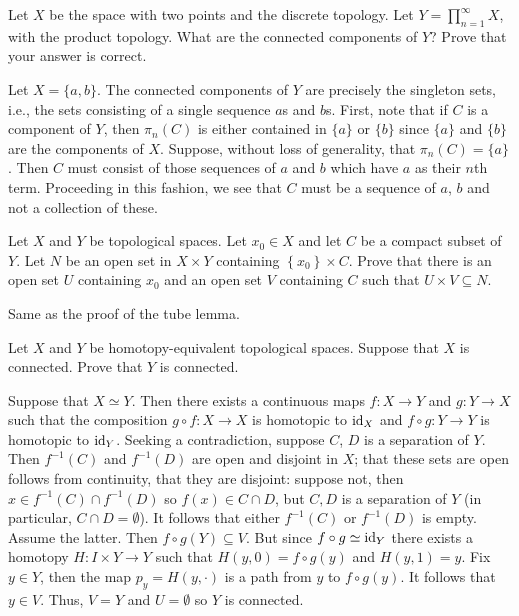 \begin{problem}
  Let \(X\) be the space with two points and the discrete topology. Let
  \(Y=\prod_{n=1}^\infty X\), with the product topology. What are the
  connected components of \(Y\)? Prove that your answer is correct.
\end{problem}
\begin{solution}
  Let \(X=\{a,b\}\). The connected components of \(Y\) are precisely the
  singleton sets, i.e., the sets consisting of a single sequence \(a\)s and
  \(b\)s. First, note that if \(C\) is a component of \(Y\), then
  \(\pi_n(C)\) is either contained in \(\{a\}\) or \(\{b\}\) since
  \(\{a\}\) and \(\{b\}\) are the components of \(X\). Suppose, without
  loss of generality, that \(\pi_n(C)=\{a\}\). Then \(C\) must consist of
  those sequences of \(a\) and \(b\) which have \(a\) as their \(n\)th
  term. Proceeding in this fashion, we see that \(C\) must be a sequence of
  \(a\), \(b\) and not a collection of these.
\end{solution}

\begin{problem}
  Let \(X\) and \(Y\) be topological spaces. Let \(x_0\in X\) and let \(C\)
  be a compact subset of \(Y\). Let \(N\) be an open set in \(X\times Y\)
  containing \(\left\{x_0\right\}\times C\). Prove that there is an open
  set \(U\) containing \(x_0\) and an open set \(V\) containing \(C\) such
  that \(U\times V\subseteq N\).
\end{problem}
\begin{solution}
  Same as the proof of the tube lemma.
\end{solution}

\begin{problem}
  Let \(X\) and \(Y\) be homotopy-equivalent topological spaces. Suppose
  that \(X\) is connected. Prove that \(Y\) is connected.
\end{problem}
\begin{solution}
  Suppose that \(X\simeq Y\). Then there exists a continuous maps
  \(f\colon X\to Y\) and \(g\colon Y\to X\) such that the composition
  \(g\circ f\colon X\to X\) is homotopic to \(\operatorname{id}_X\) and
  \(f\circ g\colon Y\to Y\) is homotopic to \(\operatorname{id}_Y\). Seeking a
  contradiction, suppose \(C\), \(D\) is a separation of \(Y\). Then
  \(f^{-1}(C)\) and \(f^{-1}(D)\) are open and disjoint in \(X\); that
  these sets are open follows from continuity, that they are disjoint:
  suppose not, then \(x\in f^{-1}(C)\cap f^{-1}(D)\) so \(f(x)\in C\cap
  D\), but \(C,D\) is a separation of \(Y\) (in particular, \(C\cap
  D=\emptyset\)). It follows that either \(f^{-1}(C)\) or \(f^{-1}(D)\) is
  empty. Assume the latter. Then \(f\circ g(Y)\subseteq V\). But since
  \(f\circ g\simeq \operatorname{id}_Y\) there exists a homotopy \(H\colon I\times Y\to
  Y\) such that \(H(y,0)=f\circ g(y)\) and \(H(y,1)=y\). Fix \(y\in Y\),
  then the map \(p_y=H(y,\cdot)\) is a path from \(y\) to \(f\circ
  g(y)\). It follows that \(y\in V\). Thus, \(V=Y\) and \(U=\emptyset\) so
  \(Y\) is connected.
\end{solution}

